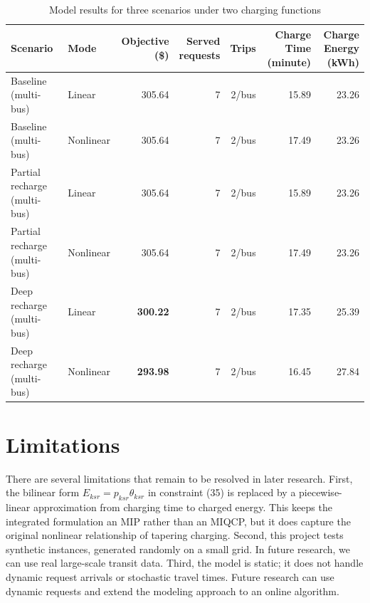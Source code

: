 \documentclass[11pt]{article}
\begin{document}
\begin{table}[H]
    \centering
    \caption{Model results for three scenarios under two charging functions}
    \small
    \begin{tabular}{llrrrrr}
        \toprule
        Scenario & Mode & Objective (\$) & \makecell{Served\\requests} & Trips &\makecell{Charge Time\\(minute)} & \makecell{Charge Energy\\ (kWh)}\\
        \midrule
        Baseline (multi-bus)        & Linear    & 305.64& 7 & 2/bus& 15.89& 23.26\\
        Baseline (multi-bus)        & Nonlinear & 305.64& 7 & 2/bus& 17.49& 23.26\\
        Partial recharge (multi-bus) & Linear    & 305.64& 7 
& 2/bus& 15.89& 23.26\\
        Partial recharge (multi-bus) & Nonlinear & 305.64& 7 & 2/bus& 17.49& 23.26\\
        Deep recharge (multi-bus)   & Linear    & \textbf{300.22}& 7 
& 2/bus& 17.35& 25.39\\
        Deep recharge (multi-bus)   & Nonlinear & \textbf{293.98}& 7 & 2/bus& 16.45& 27.84\\
        \bottomrule
    \end{tabular}
    \label{tab:direct-comparison (multi-bus)}
\end{table}






\section{Limitations}

There are several limitations that remain to be resolved in later research. First, the bilinear form \(E_{ksr}=p_{ksr}\theta_{ksr}\) in constraint (35) is replaced by a piecewise-linear approximation from charging time to charged energy. This keeps the integrated formulation an MIP rather than an MIQCP, but it does capture the original nonlinear relationship of tapering charging. Second, this project tests synthetic instances, generated randomly on a small grid. In future research, we can use real large-scale transit data. Third, the model is static; it does not handle dynamic request arrivals or stochastic travel times. Future research can use dynamic requests and extend the modeling approach to an online algorithm.
\end{document}
